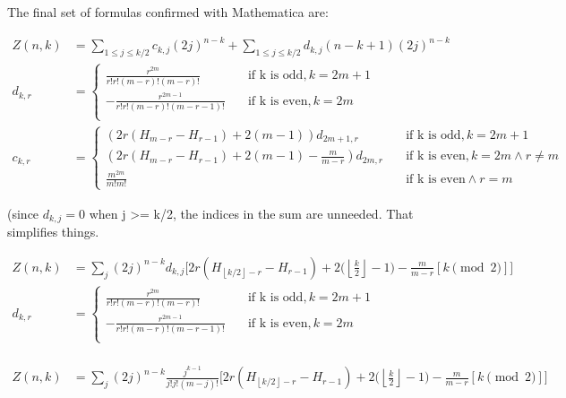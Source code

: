 \documentclass{article}
\newcommand{\floor}[1]{\left\lfloor #1 \right\rfloor}
\begin{document}
The final set of formulas confirmed with Mathematica are:

$$
\begin{aligned}
    Z(n,k)  
     &= \sum_{1 \leq j \leq k/2}c_{k,j}(2j)^{n-k} + \sum_{1 \leq j 
     \leq k/2} d_{k,j}(n-k+1)(2j)^{n-k} \\
    d_{k,r} &= \begin{cases}
        \frac{r^{2m}}{r!r!(m-r)!(m-r)!} & \quad \text{if k is odd,} \, k=2m+1 \\
        -\frac{r^{2m-1}}{r!r!(m-r)!(m-r-1)!}&\quad \text{if k is even,} \, k=2m \\
    \end{cases} \\
    c_{k,r} &= \begin{cases}
        (2r(H_{m-r}-H_{r-1})+2(m-1))d_{2m+1,r} & \quad \text{if k is odd,} \, k=2m+1 \\
        (2r(H_{m-r}-H_{r-1})+2(m-1) - \frac{m}{m-r})d_{2m,r} &\quad \text{if k is even,} \, k=2m \land r\neq m\\
        \frac{m^{2m}}{m!m!} & \quad \text{if k is even} \land r=m 
    \end{cases}
\end{aligned}
$$

(since $d_{k,j} =0$ when j >= k/2, the indices in the sum are unneeded. That simplifies things.

$$
\begin{aligned}
    Z(n,k) &= \sum_{j}(2j)^{n-k}d_{k,j}\bigg[2r(H_{\floor{k/2}-r} - H_{r-1})+2\bigg(\floor{\frac{k}{2}}-1\bigg)-\frac{m}{m-r}[k \pmod 2]\bigg]\\
        d_{k,r} &= \begin{cases}
        \frac{r^{2m}}{r!r!(m-r)!(m-r)!} & \quad \text{if k is odd,} \, k=2m+1 \\
        -\frac{r^{2m-1}}{r!r!(m-r)!(m-r-1)!}&\quad \text{if k is even,} \, k=2m \\
    \end{cases} \\
\end{aligned}
$$

$$
\begin{aligned}
    Z(n,k) &= \sum_{j}(2j)^{n-k}\frac{j^{k-1}}{j!j!(m-j)!}\bigg[2r(H_{\floor{k/2}-r} - H_{r-1})+2\bigg(\floor{\frac{k}{2}}-1\bigg)-\frac{m}{m-r}[k \pmod 2]\bigg]\\
\end{aligned}
$$
\printbibliography
\end{document}
